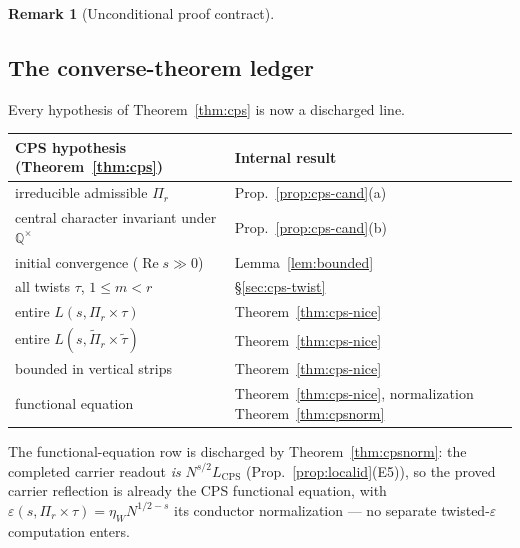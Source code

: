 \documentclass[11pt]{article}
\theoremstyle{definition}
\newtheorem{remark}[theorem]{Remark}
\renewcommand{\Re}{\operatorname{Re}}
\begin{document}
\begin{remark}[Unconditional proof contract]
\begin{enumerate}
\section{The converse-theorem ledger}\label{sec:cps-ledger}
Every hypothesis of Theorem~\ref{thm:cps} is now a discharged line.

\begin{center}
\begin{tabular}{ll}
\toprule
CPS hypothesis (Theorem~\ref{thm:cps}) & Internal result \\
\midrule
irreducible admissible $\Pi_r$ & Prop.~\ref{prop:cps-cand}(a) \\
central character invariant under $\mathbb Q^\times$ & Prop.~\ref{prop:cps-cand}(b) \\
initial convergence ($\Re s\gg0$) & Lemma~\ref{lem:bounded} \\
all twists $\tau$, $1\le m<r$ & \S\ref{sec:cps-twist} \\
entire $L(s,\Pi_r\times\tau)$ & Theorem~\ref{thm:cps-nice} \\
entire $L(s,\widetilde\Pi_r\times\widetilde\tau)$ & Theorem~\ref{thm:cps-nice} \\
bounded in vertical strips & Theorem~\ref{thm:cps-nice} \\
functional equation & Theorem~\ref{thm:cps-nice}, normalization Theorem~\ref{thm:cpsnorm} \\
\bottomrule
\end{tabular}
\end{center}

\noindent The functional-equation row is discharged by Theorem~\ref{thm:cpsnorm}: the completed carrier
readout \emph{is} $N^{s/2}L_{\mathrm{CPS}}$ (Prop.~\ref{prop:localid}(E5)), so the proved carrier reflection is
already the CPS functional equation, with $\varepsilon(s,\Pi_r\times\tau)=\eta_W N^{1/2-s}$ its conductor
normalization --- no separate twisted-$\varepsilon$ computation enters.


\end{enumerate}
\end{remark}
\end{document}
